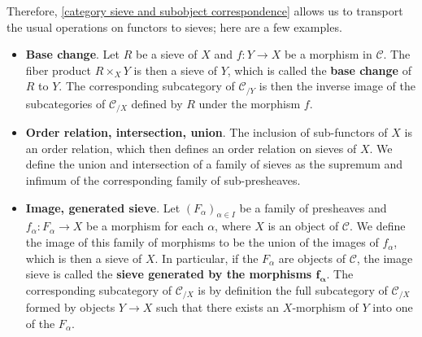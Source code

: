 Therefore, \cref{category sieve and subobject correspondence} allows us to transport the usual operations on functors to sieves; here are a few examples.
\begin{itemize}
\item \textbf{Base change}. Let $R$ be a sieve of $X$ and $f:Y\to X$ be a morphism in $\mathcal{C}$. The fiber product $R\times_XY$ is then a sieve of $Y$, which is called the \textbf{base change} of $R$ to $Y$. The corresponding subcategory of $\mathcal{C}_{/Y}$ is then the inverse image of the subcategories of $\mathcal{C}_{/X}$ defined by $R$ under the morphism $f$.
\item \textbf{Order relation, intersection, union}. The inclusion of sub-functors of $X$ is an order relation, which then defines an order relation on sieves of $X$. We define the union and intersection of a family of sieves as the supremum and infimum of the corresponding family of sub-presheaves.
\item \textbf{Image, generated sieve}. Let $(F_\alpha)_{\alpha\in I}$ be a family of presheaves and $f_\alpha:F_\alpha\to X$ be a morphism for each $\alpha$, where $X$ is an object of $\mathcal{C}$. We define the image of this family of morphisms to be the union of the images of $f_\alpha$, which is then a sieve of $X$. In particular, if the $F_\alpha$ are objects of $\mathcal{C}$, the image sieve is called the \textbf{sieve generated by the morphisms $\bm{f_\alpha}$}. The corresponding subcategory of $\mathcal{C}_{/X}$ is by definition the full subcategory of $\mathcal{C}_{/X}$ formed by objects $Y\to X$ such that there exists an $X$-morphism of $Y$ into one of the $F_\alpha$.
\end{itemize}

